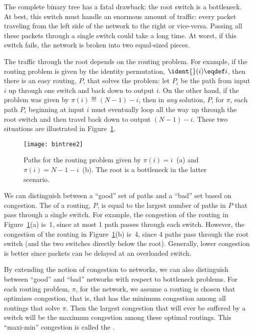 The complete binary tree has a fatal drawback: the root switch is a
bottleneck.  At best, this switch must handle an enormous amount of
traffic: every packet traveling from the left side of the network to the
right or vice-versa.  Passing all these packets through a single switch
could take a long time.  At worst, if this switch fails, the network is
broken into two equal-sized pieces.

The traffic through the root depends on the routing problem.  For
example, if the routing problem is given by the identity permutation,
 $\ident{}(i) \eqdef i$, then
there is an easy routing, $P$, that solves the problem: let $P_i$ be
the path from input $i$ up through one switch and back down to output
$i$.  On the other hand, if the problem was given by $\pi(i) \eqdef (N
- 1) - i$, then in \emph{any} solution, $P$, for $\pi$, each path
$P_i$ beginning at input $i$ must eventually loop all the way up
through the root switch and then travel back down to output $(N - 1) -
i$.  These two situations are illustrated in Figure~\ref{fig:6EJ}.

\begin{figure}


\texttt{[image: bintree2]}

\caption{Paths for the routing problem given by $\pi(i) = i$~(a) and
  $\pi(i) = N - 1 - i$~(b).  The root is a bottleneck in the latter
  scenario.}

\label{fig:6EJ}

\end{figure}

We can distinguish between a ``good'' set of paths and a ``bad'' set
based on congestion.  The  of a routing, $P$, is
equal to the largest number of paths in $P$ that pass through a single
switch.  For example, the congestion of the routing in
Figure~\ref{fig:6EJ}(a) is~1, since at most 1 path passes through each
switch.  However, the congestion of the routing in
Figure~\ref{fig:6EJ}(b) is~4, since 4 paths pass through the root
switch (and the two switches directly below the root).  Generally,
lower congestion is better since packets can be delayed at an
overloaded switch.

By extending the notion of congestion to networks, we can also distinguish
between ``good'' and ``bad'' networks with respect to bottleneck problems.
For each routing problem, $\pi$, for the network, we assume a routing is
chosen that optimizes congestion, that is, that has the minimum congestion
among all routings that solve $\pi$.  Then the largest congestion that
will ever be suffered by a switch will be the maximum congestion among
these optimal routings.  This ``maxi-min'' congestion is called the
.

